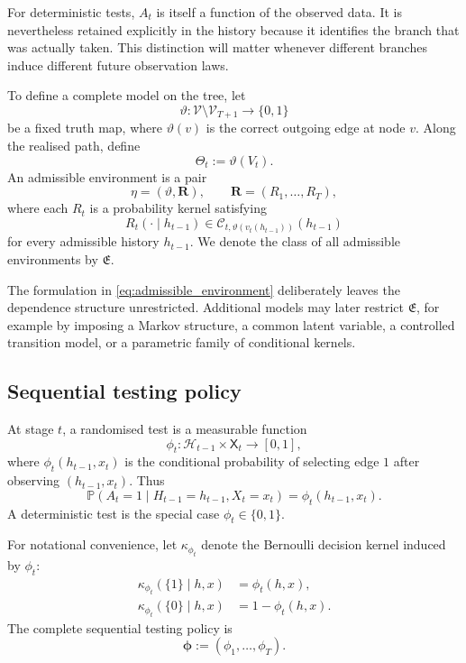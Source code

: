 \documentclass[11pt]{article}
\newcommand{\Prob}{\mathbb{P}}
\newcommand{\cC}{\mathcal{C}}
\newcommand{\cH}{\mathcal{H}}
\newcommand{\cV}{\mathcal{V}}
\begin{document}
For deterministic tests, $A_t$ is itself a function of the observed data. It is nevertheless retained explicitly in the history because it identifies the branch that was actually taken. This distinction will matter whenever different branches induce different future observation laws.

To define a complete model on the tree, let
\[
\vartheta:\cV\setminus\cV_{T+1}\to\{0,1\}
\]
be a fixed truth map, where $\vartheta(v)$ is the correct outgoing edge at node $v$. Along the realised path, define
\begin{equation}
\Theta_t:=\vartheta(V_t).
\label{eq:true_edge}
\end{equation}
An admissible environment is a pair
\[
\eta=(\vartheta,\mathbf{R}),
\qquad
\mathbf{R}=(R_1,\ldots,R_T),
\]
where each $R_t$ is a probability kernel satisfying
\begin{equation}
R_t(\cdot\mid h_{t-1})
\in
\cC_{t,\vartheta(v_t(h_{t-1}))}(h_{t-1})
\label{eq:admissible_environment}
\end{equation}
for every admissible history $h_{t-1}$. We denote the class of all admissible environments by $\mathfrak{E}$.

The formulation in \eqref{eq:admissible_environment} deliberately leaves the dependence structure unrestricted. Additional models may later restrict $\mathfrak{E}$, for example by imposing a Markov structure, a common latent variable, a controlled transition model, or a parametric family of conditional kernels.

\subsection{Sequential testing policy}

At stage $t$, a randomised test is a measurable function
\begin{equation}
\phi_t:\cH_{t-1}\times\mathsf{X}_t\to[0,1],
\label{eq:local_test}
\end{equation}
where $\phi_t(h_{t-1},x_t)$ is the conditional probability of selecting edge $1$ after observing $(h_{t-1},x_t)$. Thus
\begin{equation}
\Prob(A_t=1\mid H_{t-1}=h_{t-1},X_t=x_t)
=
\phi_t(h_{t-1},x_t).
\label{eq:decision_rule}
\end{equation}
A deterministic test is the special case $\phi_t\in\{0,1\}$.

For notational convenience, let $\kappa_{\phi_t}$ denote the Bernoulli decision kernel induced by $\phi_t$:
\begin{align}
\kappa_{\phi_t}(\{1\}\mid h,x)&=\phi_t(h,x),\\
\kappa_{\phi_t}(\{0\}\mid h,x)&=1-\phi_t(h,x).
\end{align}
The complete sequential testing policy is
\[
\boldsymbol{\phi}:=(\phi_1,\ldots,\phi_T).
\]
\end{document}
